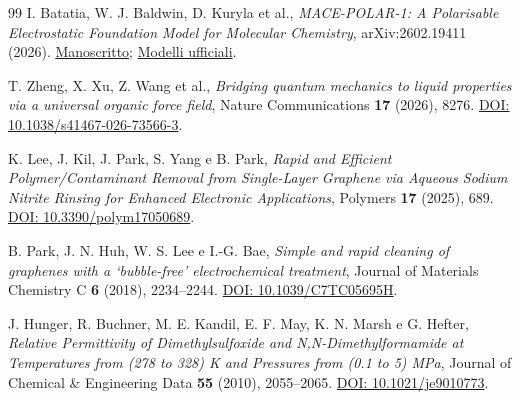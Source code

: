 \documentclass[11pt,reqno]{amsart}
\numberwithin{equation}{section}
\begin{document}
\begin{thebibliography}{99}
I. Batatia, W. J. Baldwin, D. Kuryla et al.,
\emph{MACE-POLAR-1: A Polarisable Electrostatic Foundation Model
for Molecular Chemistry}, arXiv:2602.19411 (2026).
\href{https://arxiv.org/abs/2602.19411}{Manoscritto};
\href{https://github.com/ACEsuit/mace-foundations/releases/tag/mace_polar_1}{Modelli ufficiali}.

T. Zheng, X. Xu, Z. Wang et al.,
\emph{Bridging quantum mechanics to liquid properties via a universal
organic force field}, Nature Communications \textbf{17} (2026), 8276.
\href{https://doi.org/10.1038/s41467-026-73566-3}{DOI: 10.1038/s41467-026-73566-3}.

K. Lee, J. Kil, J. Park, S. Yang e B. Park,
\emph{Rapid and Efficient Polymer/Contaminant Removal from Single-Layer
Graphene via Aqueous Sodium Nitrite Rinsing for Enhanced Electronic Applications},
Polymers \textbf{17} (2025), 689.
\href{https://doi.org/10.3390/polym17050689}{DOI: 10.3390/polym17050689}.

B. Park, J. N. Huh, W. S. Lee e I.-G. Bae,
\emph{Simple and rapid cleaning of graphenes with a `bubble-free'
electrochemical treatment}, Journal of Materials Chemistry C
\textbf{6} (2018), 2234--2244.
\href{https://doi.org/10.1039/C7TC05695H}{DOI: 10.1039/C7TC05695H}.

J. Hunger, R. Buchner, M. E. Kandil, E. F. May, K. N. Marsh e G. Hefter,
\emph{Relative Permittivity of Dimethylsulfoxide and N,N-Dimethylformamide
at Temperatures from (278 to 328) K and Pressures from (0.1 to 5) MPa},
Journal of Chemical \& Engineering Data \textbf{55} (2010), 2055--2065.
\href{https://doi.org/10.1021/je9010773}{DOI: 10.1021/je9010773}.

\end{thebibliography}
\end{document}
